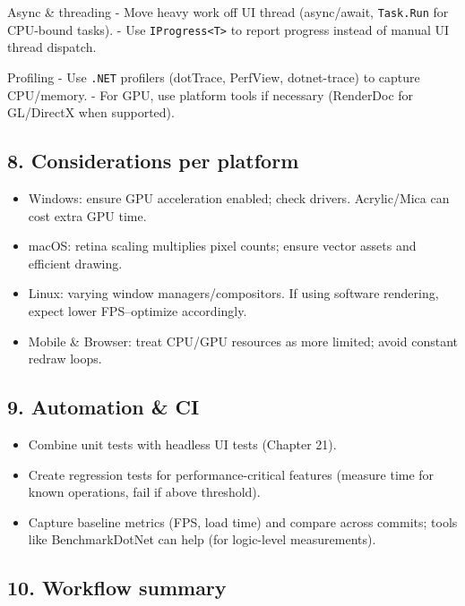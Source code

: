 Async \& threading - Move heavy work off UI thread (async/await,
\passthrough{\lstinline!Task.Run!} for CPU-bound tasks). - Use
\passthrough{\lstinline!IProgress<T>!} to report progress instead of
manual UI thread dispatch.

Profiling - Use \passthrough{\lstinline!.NET!} profilers (dotTrace,
PerfView, dotnet-trace) to capture CPU/memory. - For GPU, use platform
tools if necessary (RenderDoc for GL/DirectX when supported).

\subsection{8. Considerations per
platform}\label{considerations-per-platform}

\begin{itemize}
\tightlist
\item
  Windows: ensure GPU acceleration enabled; check drivers. Acrylic/Mica
  can cost extra GPU time.
\item
  macOS: retina scaling multiplies pixel counts; ensure vector assets
  and efficient drawing.
\item
  Linux: varying window managers/compositors. If using software
  rendering, expect lower FPS--optimize accordingly.
\item
  Mobile \& Browser: treat CPU/GPU resources as more limited; avoid
  constant redraw loops.
\end{itemize}

\subsection{9. Automation \& CI}\label{automation-ci}

\begin{itemize}
\tightlist
\item
  Combine unit tests with headless UI tests (Chapter 21).
\item
  Create regression tests for performance-critical features (measure
  time for known operations, fail if above threshold).
\item
  Capture baseline metrics (FPS, load time) and compare across commits;
  tools like BenchmarkDotNet can help (for logic-level measurements).
\end{itemize}

\subsection{10. Workflow summary}\label{workflow-summary}

